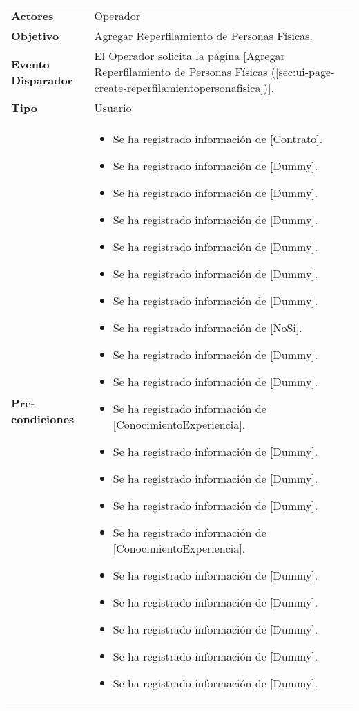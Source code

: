 	\begin{tabular}{ p{3.5cm} p{11.5cm} }
		\textbf{Actores} & Operador\\
		\textbf{Objetivo} & Agregar Reperfilamiento de Personas F\'isicas.\\
		\textbf{Evento Disparador} & El Operador solicita la p\'agina [Agregar Reperfilamiento de Personas F\'isicas (\ref{sec:ui-page-create-reperfilamientopersonafisica})].\\
		\textbf{Tipo} & Usuario\\
		\textbf{Pre-condiciones} &
			\begin{minipage}[t]{0.6\textwidth}
			\begin{itemize}[noitemsep,nolistsep]
			\setlength{\itemindent}{-.5cm}
				\item Se ha registrado informaci\'on de [Contrato].
				\item Se ha registrado informaci\'on de [Dummy].
				\item Se ha registrado informaci\'on de [Dummy].
				\item Se ha registrado informaci\'on de [Dummy].
				\item Se ha registrado informaci\'on de [Dummy].
				\item Se ha registrado informaci\'on de [Dummy].
				\item Se ha registrado informaci\'on de [Dummy].
				\item Se ha registrado informaci\'on de [NoSi].
				\item Se ha registrado informaci\'on de [Dummy].
				\item Se ha registrado informaci\'on de [Dummy].
				\item Se ha registrado informaci\'on de [ConocimientoExperiencia].
				\item Se ha registrado informaci\'on de [Dummy].
				\item Se ha registrado informaci\'on de [Dummy].
				\item Se ha registrado informaci\'on de [Dummy].
				\item Se ha registrado informaci\'on de [ConocimientoExperiencia].
				\item Se ha registrado informaci\'on de [Dummy].
				\item Se ha registrado informaci\'on de [Dummy].
				\item Se ha registrado informaci\'on de [Dummy].
				\item Se ha registrado informaci\'on de [Dummy].
				\item Se ha registrado informaci\'on de [Dummy].

\end{itemize}
\end{minipage}
\end{tabular}
